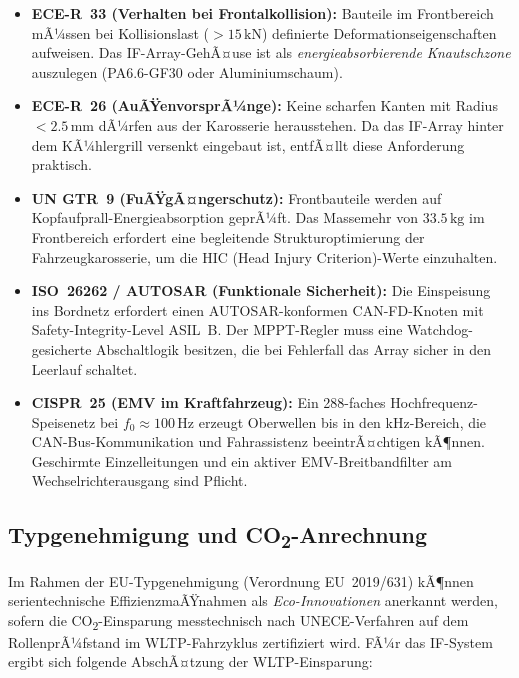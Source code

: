 ﻿\documentclass[12pt, a4paper]{report}
\theoremstyle{definition}
\theoremstyle{remark}
\begin{document}
\begin{itemize}
  \item \textbf{ECE-R~33 (Verhalten bei Frontalkollision):} Bauteile im
        Frontbereich mÃ¼ssen bei Kollisionslast ($> 15\,\text{kN}$) definierte
        Deformationseigenschaften aufweisen. Das IF-Array-GehÃ¤use ist als
        \emph{energieabsorbierende Knautschzone} auszulegen (PA6.6-GF30
        oder Aluminiumschaum).

  \item \textbf{ECE-R~26 (AuÃŸenvorsprÃ¼nge):} Keine scharfen Kanten mit
        Radius $< 2.5\,\text{mm}$ dÃ¼rfen aus der Karosserie herausstehen.
        Da das IF-Array hinter dem KÃ¼hlergrill versenkt eingebaut ist,
        entfÃ¤llt diese Anforderung praktisch.

  \item \textbf{UN GTR~9 (FuÃŸgÃ¤ngerschutz):} Frontbauteile werden auf
        Kopfaufprall-Energie\-absorption geprÃ¼ft. Das Massemehr von
        $33.5\,\text{kg}$ im Frontbereich erfordert eine begleitende
        Strukturoptimierung der Fahrzeugkarosserie, um die HIC
        (Head Injury Criterion)-Werte einzuhalten.

  \item \textbf{ISO~26262 / AUTOSAR (Funktionale Sicherheit):} Die
        Einspeisung ins Bordnetz erfordert einen AUTOSAR-konformen
        CAN-FD-Knoten mit Safety-Integrity-Level ASIL~B. Der MPPT-Regler
        muss eine Watchdog-gesicherte Abschaltlogik besitzen, die bei
        Fehlerfall das Array sicher in den Leerlauf schaltet.

  \item \textbf{CISPR~25 (EMV im Kraftfahrzeug):} Ein 288-faches Hochfrequenz-
        Speisenetz bei $f_0 \approx 100\,\text{Hz}$ erzeugt Oberwellen bis
        in den kHz-Bereich, die CAN-Bus-Kommunikation und Fahrassistenz
        beeintrÃ¤chtigen kÃ¶nnen. Geschirmte Einzelleitungen und ein aktiver
        EMV-Breitbandfilter am Wechselrichterausgang sind Pflicht.
\end{itemize}

\subsection{\texorpdfstring{Typgenehmigung und CO\textsubscript{2}-Anrechnung}{Typgenehmigung und CO2-Anrechnung}}

Im Rahmen der EU-Typgenehmigung (Verordnung EU~2019/631) kÃ¶nnen
serien\-technische EffizienzmaÃŸnahmen als \emph{Eco-Innovationen}
anerkannt werden, sofern die CO\textsubscript{2}-Einsparung messtechnisch
nach UNECE-Verfahren auf dem RollenprÃ¼fstand im WLTP-Fahrzyklus zertifiziert
wird. FÃ¼r das IF-System ergibt sich folgende AbschÃ¤tzung der WLTP-Einsparung:
\end{document}
